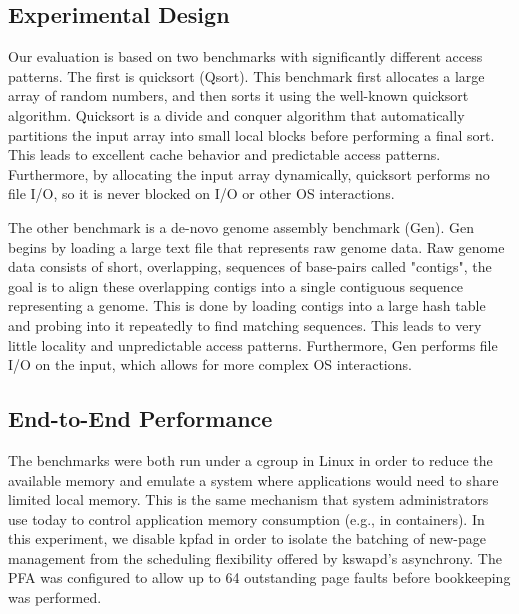 \subsection{Experimental Design} \label{sec:expDesign}
  Our evaluation is based on two benchmarks with significantly different access
  patterns. The first is quicksort (Qsort). This benchmark first allocates a
  large array of random numbers, and then sorts it using the well-known
  quicksort algorithm.  Quicksort is a divide and conquer algorithm that
  automatically partitions the input array into small local blocks before
  performing a final sort. This leads to excellent cache behavior and
  predictable access patterns.  Furthermore, by allocating the input array
  dynamically, quicksort performs no file I/O, so it is never blocked on I/O or
  other OS interactions.

  The other benchmark is a de-novo genome assembly benchmark (Gen). Gen begins
  by loading a large text file that represents raw genome data. Raw genome data
  consists of short, overlapping, sequences of base-pairs called "contigs", the
  goal is to align these overlapping contigs into a single contiguous sequence
  representing a genome. This is done by loading contigs into a large hash
  table and probing into it repeatedly to find matching sequences. This leads
  to very little locality and unpredictable access patterns. Furthermore, Gen
  performs file I/O on the input, which allows for more complex OS
  interactions.

\subsection{End-to-End Performance} \label{sec:fullPerf}
  The benchmarks were both run under a cgroup in Linux in order to reduce the
  available memory and emulate a system where applications would need to share
  limited local memory. This is the same mechanism that system administrators
  use today to control application memory consumption (e.g., in containers). In
  this experiment, we disable kpfad in order to isolate the batching of
  new-page management from the scheduling flexibility offered by kswapd's
  asynchrony.  The PFA was configured to allow up to 64 outstanding page faults
  before bookkeeping was performed.


